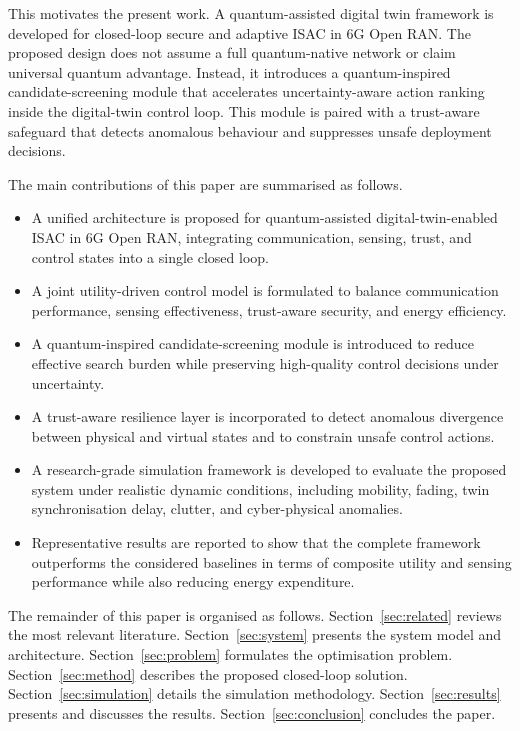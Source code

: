 \documentclass[10pt,journal]{IEEEtran}
\begin{document}
This motivates the present work. A quantum-assisted digital twin framework is developed for closed-loop secure and adaptive ISAC in 6G Open RAN. The proposed design does not assume a full quantum-native network or claim universal quantum advantage. Instead, it introduces a quantum-inspired candidate-screening module that accelerates uncertainty-aware action ranking inside the digital-twin control loop. This module is paired with a trust-aware safeguard that detects anomalous behaviour and suppresses unsafe deployment decisions.

The main contributions of this paper are summarised as follows.
\begin{itemize}
    \item A unified architecture is proposed for quantum-assisted digital-twin-enabled ISAC in 6G Open RAN, integrating communication, sensing, trust, and control states into a single closed loop.
    \item A joint utility-driven control model is formulated to balance communication performance, sensing effectiveness, trust-aware security, and energy efficiency.
    \item A quantum-inspired candidate-screening module is introduced to reduce effective search burden while preserving high-quality control decisions under uncertainty.
    \item A trust-aware resilience layer is incorporated to detect anomalous divergence between physical and virtual states and to constrain unsafe control actions.
    \item A research-grade simulation framework is developed to evaluate the proposed system under realistic dynamic conditions, including mobility, fading, twin synchronisation delay, clutter, and cyber-physical anomalies.
    \item Representative results are reported to show that the complete framework outperforms the considered baselines in terms of composite utility and sensing performance while also reducing energy expenditure.
\end{itemize}

The remainder of this paper is organised as follows. Section~\ref{sec:related} reviews the most relevant literature. Section~\ref{sec:system} presents the system model and architecture. Section~\ref{sec:problem} formulates the optimisation problem. Section~\ref{sec:method} describes the proposed closed-loop solution. Section~\ref{sec:simulation} details the simulation methodology. Section~\ref{sec:results} presents and discusses the results. Section~\ref{sec:conclusion} concludes the paper.
\end{document}
